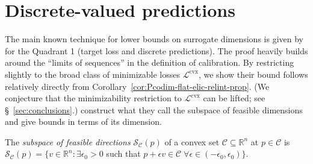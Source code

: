 \documentclass[anon,12pt]{colt2021} %
\newcommand{\Comments}{1}
\newcommand{\mynote}[2]{\ifnum\Comments=1\textcolor{#1}{#2}\fi}
\newcommand{\mytodo}[2]{\ifnum\Comments=1%
	\todo[linecolor=#1!80!black,backgroundcolor=#1,bordercolor=#1!80!black]{#2}\fi}
\newcommand{\jessiet}[1]{\mytodo{purple!20!white}{JF: #1}}
\newcommand{\bo}[1]{\mynote{blue}{[Bo: #1]}}
\newcommand{\reals}{\mathbb{R}}
\newcommand{\C}{\mathcal{C}}
\newcommand{\Lcvx}{\mathcal{L}^{\mathrm{cvx}}}
\newcommand{\Sc}{\mathcal{S}}  %
\begin{document}

\section{Discrete-valued predictions}\label{sec:finite-calib}

The main known technique for lower bounds on surrogate dimensions is given by \citet{ramaswamy2016convex} for the Quadrant 1 (target loss and discrete predictions).
The proof heavily builds around the ``limits of sequences'' in the definition of calibration.
By restricting slightly to the broad class of minimizable losses $\Lcvx$, we show their bound follows relatively directly from Corollary~\ref{cor:Pcodim-flat-elic-relint-prop}.
(We conjecture that the minimizability restriction to $\Lcvx$ can be lifted; see \S~\ref{sec:conclusions}.)
\citet{ramaswamy2016convex} construct what they call the subspace of feasible dimensions and give bounds in terms of its dimension.
\begin{definition}\label{def:subspace-feas}
	The \emph{subspace of feasible directions} $\Sc_\C(p)$ of a convex set $\C \subseteq \reals^n$ at $p \in \C$ is $\Sc_\C(p) = \{ v \in \reals^n : \exists \epsilon_0 > 0 $ such that $p + \epsilon v \in \C \; \forall \epsilon \in (-\epsilon_0,\epsilon_0) \}$.
\end{definition}
\end{document}

